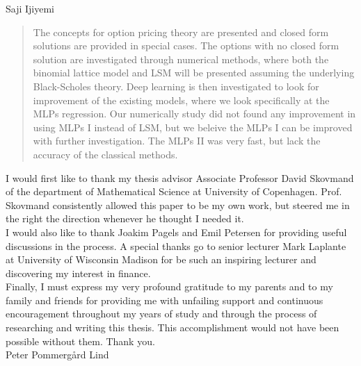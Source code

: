 \documentclass[
11pt, %
oneside, %
english, %
singlespacing, %
headsepline, %
]{MastersDoctoralThesis} %
\theoremstyle{assumption}
\theoremstyle{definition}
\theoremstyle{proposition}
\begin{document}
\hfill Saji Ijiyemi


\begin{abstract}
\addchaptertocentry{\abstractname} %
The concepts for option pricing theory are presented and closed form solutions are provided in special cases. The options with no closed form solution are investigated through numerical methods, where both the binomial lattice model and LSM will be presented assuming the underlying Black-Scholes theory. Deep learning is then investigated to look for improvement of the existing models, where we look specifically at the MLPs regression. Our numerically study did not found any improvement in using MLPs I instead of LSM, but we beleive the MLPs I can be improved with further investigation. The MLPs II was very fast, but lack the accuracy of the classical methods.
\end{abstract}


\begin{acknowledgements}
\addchaptertocentry{\acknowledgementname} %
I would first like to thank my thesis advisor Associate Professor David Skovmand of the department of Mathematical Science at University of Copenhagen. Prof. Skovmand consistently allowed this paper to be my own work, but steered me in the right the direction whenever he thought I needed it.\\

I would also like to thank Joakim Pagels and Emil Petersen for providing useful discussions in the process. A special thanks go to senior lecturer Mark Laplante at University of Wisconsin Madison for be such an inspiring lecturer and discovering my interest in finance.\\

Finally, I must express my very profound gratitude to my parents and to my family and friends for providing me with unfailing support and continuous encouragement throughout my years of study and through the process of researching and writing this thesis. This accomplishment would not have been possible without them. Thank you.\\

Peter Pommergård Lind
\end{acknowledgements}
\end{document}
